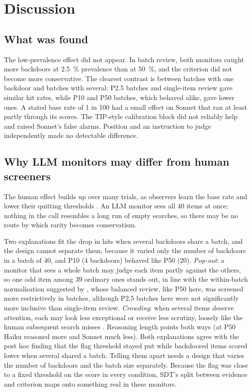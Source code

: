 \documentclass[manuscript, screen, review]{jair}
\begin{document}
\section{Discussion}\label{sec:discussion}

\subsection{What was found}\label{sec:found}

The low-prevalence effect did not appear. In batch review, both monitors caught more backdoors at \SI{2.5}{\percent} prevalence than at \SI{50}{\percent}, and the criterion did not become more conservative. The clearest contrast is between batches with one backdoor and batches with several: P2.5 batches and single-item review gave similar hit rates, while P10 and P50 batches, which behaved alike, gave lower ones. A stated base rate of 1 in 100 had a small effect on Sonnet that ran at least partly through its scores. The TIP-style calibration block did not reliably help and raised Sonnet's false alarms. Position and an instruction to judge independently made no detectable difference.

\subsection{Why LLM monitors may differ from human screeners}\label{sec:why}

The human effect builds up over many trials, as observers learn the base rate and lower their quitting thresholds \parencite{wolfe2005,wolfe2007}. An LLM monitor sees all 40 items at once; nothing in the call resembles a long run of empty searches, so there may be no route by which rarity becomes conservatism.

Two explanations fit the drop in hits when several backdoors share a batch, and the design cannot separate them, because it varied only the number of backdoors in a batch of 40, and P10 (4 backdoors) behaved like P50 (20). \emph{Pop-out}: a monitor that sees a whole batch may judge each item partly against the others, so one odd item among 39 ordinary ones stands out, in line with the within-batch normalisation suggested by \textcite{hida2026}, whose balanced review, like P50 here, was screened more restrictively in batches, although P2.5 batches here were not significantly more inclusive than single-item review. \emph{Crowding}: when several items deserve attention, each may look less exceptional or receive less scrutiny, loosely like the human subsequent search misses \parencite{cain2013}. Reasoning length points both ways (at P50 Haiku reasoned more and Sonnet much less). Both explanations agree with the post hoc finding that the flag threshold stayed put while backdoored items scored lower when several shared a batch. Telling them apart needs a design that varies the number of backdoors and the batch size separately. Because the flag was close to a fixed threshold on the score in every condition, SDT's split between evidence and criterion maps onto something real in these monitors.
\end{document}
